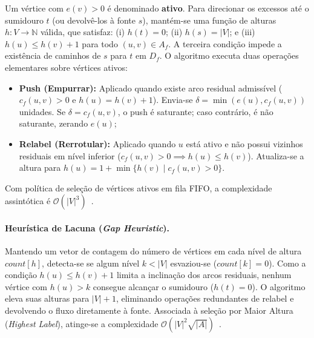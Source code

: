 \documentclass[12pt,a4paper]{article}
\begin{document}
Um vértice com $e(v) > 0$ é denominado \textbf{ativo}. Para direcionar os excessos até o sumidouro $t$ (ou devolvê-los à fonte $s$), mantém-se uma função de alturas $h: V \to \mathbb{N}$ válida, que satisfaz: (i) $h(t) = 0$; (ii) $h(s) = |V|$; e (iii) $h(u) \le h(v) + 1$ para todo $(u, v) \in A_f$. A terceira condição impede a existência de caminhos de $s$ para $t$ em $D_f$. O algoritmo executa duas operações elementares sobre vértices ativos:
\begin{itemize}
    \item \textbf{Push (Empurrar):} Aplicado quando existe arco residual admissível ($c_f(u, v) > 0$ e $h(u) = h(v) + 1$). Envia-se $\delta = \min(e(u), c_f(u, v))$ unidades. Se $\delta = c_f(u, v)$, o push é saturante; caso contrário, é não saturante, zerando $e(u)$;
    \item \textbf{Relabel (Rerrotular):} Aplicado quando $u$ está ativo e não possui vizinhos residuais em nível inferior ($c_f(u, v) > 0 \implies h(u) \le h(v)$). Atualiza-se a altura para $h(u) = 1 + \min \{h(v) \mid c_f(u, v) > 0\}$.
\end{itemize}

Com política de seleção de vértices ativos em fila FIFO, a complexidade assintótica é $\mathcal{O}(|V|^3)$~\cite{goldberg1988new}.

\paragraph{Heurística de Lacuna (\textit{Gap Heuristic}).} Mantendo um vetor de contagem do número de vértices em cada nível de altura $count[h]$, detecta-se se algum nível $k < |V|$ esvaziou-se ($count[k] = 0$). Como a condição $h(u) \le h(v) + 1$ limita a inclinação dos arcos residuais, nenhum vértice com $h(u) > k$ consegue alcançar o sumidouro ($h(t) = 0$). O algoritmo eleva suas alturas para $|V| + 1$, eliminando operações redundantes de relabel e devolvendo o fluxo diretamente à fonte. Associada à seleção por Maior Altura (\textit{Highest Label}), atinge-se a complexidade $\mathcal{O}(|V|^2 \sqrt{|A|})$~\cite{goldberg1988new}.
\end{document}
